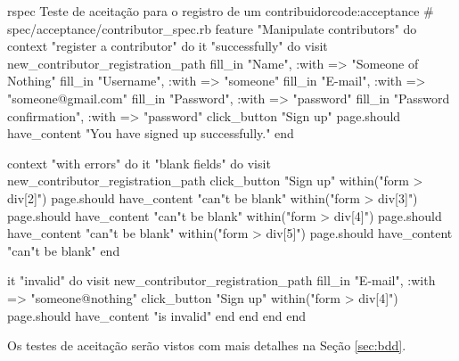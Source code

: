 \begin{mycode}{rspec}%
{Teste de aceitação para o registro de um contribuidor}{code:acceptance}
# spec/acceptance/contributor_spec.rb
feature "Manipulate contributors" do
  context "register a contributor" do
    it "successfully" do
      visit new_contributor_registration_path
      fill_in "Name", :with => "Someone of Nothing"
      fill_in "Username", :with => "someone"
      fill_in "E-mail", :with => "someone@gmail.com"
      fill_in "Password", :with => "password"
      fill_in "Password confirmation", :with => "password"
      click_button "Sign up"
      page.should have_content "You have signed up successfully."
    end

    context "with errors" do
      it "blank fields" do
        visit new_contributor_registration_path
        click_button "Sign up"
        within("form > div[2]") { page.should have_content "can"t be blank"}
        within("form > div[3]") { page.should have_content "can"t be blank"}
        within("form > div[4]") { page.should have_content "can"t be blank"}
        within("form > div[5]") { page.should have_content "can"t be blank"}
      end

      it "invalid" do
        visit new_contributor_registration_path
        fill_in "E-mail", :with => "someone@nothing"
        click_button "Sign up"
        within("form > div[4]") { page.should have_content "is invalid"}
      end
    end
  end
end
\end{mycode}

Os testes de aceitação serão vistos com mais detalhes na Seção \ref{sec:bdd}.


